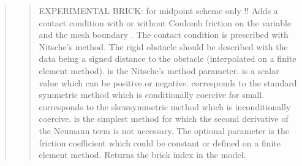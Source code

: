 \documentclass[a4paper,11pt,english]{sphinxmanual}
\begin{document}
\begin{quote}
\begin{quote}

EXPERIMENTAL BRICK: for midpoint scheme only !!
Adds a contact condition with or without Coulomb friction on the variable
 and the mesh boundary . The contact condition
is prescribed with Nitsche’s method. The rigid obstacle should
be described with the data  being a signed distance to
the obstacle (interpolated on a finite element method).
 is the Nitsche’s method parameter.
 is a scalar value which can be
positive or negative.  corresponds to the standard symmetric
method which is conditionally coercive for   small.
 corresponds to the skew\sphinxhyphen{}symmetric method which is
inconditionally coercive.  is the simplest method
for which the second derivative of the Neumann term is not necessary.
The optional parameter  is the friction
coefficient which could be constant or defined on a finite element
method.
Returns the brick index in the model.
\end{quote}

\begin{quote}


\end{quote}
\end{quote}
\end{document}
